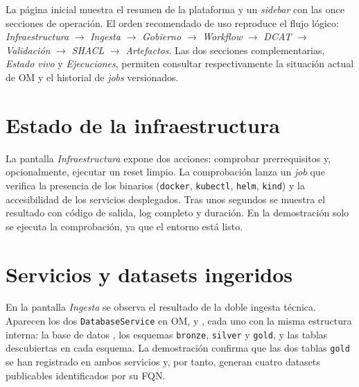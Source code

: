 La página inicial muestra el resumen de la plataforma y un \emph{sidebar} con las once secciones de operación. El orden recomendado de uso reproduce el flujo lógico: \emph{Infraestructura} $\to$ \emph{Ingesta} $\to$ \emph{Gobierno} $\to$ \emph{Workflow} $\to$ \emph{DCAT} $\to$ \emph{Validación} $\to$ \emph{SHACL} $\to$ \emph{Artefactos}. Las dos secciones complementarias, \emph{Estado vivo} y \emph{Ejecuciones}, permiten consultar respectivamente la situación actual de \ac{OM} y el historial de \emph{jobs} versionados.


\section{Estado de la infraestructura}\label{sec:demo-infra}

La pantalla \emph{Infraestructura} expone dos acciones: comprobar prerrequisitos y, opcionalmente, ejecutar un reset limpio. La comprobación lanza un \emph{job} que verifica la presencia de los binarios (\texttt{docker}, \texttt{kubectl}, \texttt{helm}, \texttt{kind}) y la accesibilidad de los servicios desplegados. Tras unos segundos se muestra el resultado con código de salida, log completo y duración. En la demostración solo se ejecuta la comprobación, ya que el entorno está listo.


\section{Servicios y datasets ingeridos}\label{sec:demo-ingesta}

En la pantalla \emph{Ingesta} se observa el resultado de la doble ingesta técnica. Aparecen los dos \texttt{DatabaseService} en \ac{OM},  y , cada uno con la misma estructura interna: la base de datos , los esquemas \texttt{bronze}, \texttt{silver} y \texttt{gold}, y las tablas descubiertas en cada esquema. La demostración confirma que las dos tablas \texttt{gold} se han registrado en ambos servicios y, por tanto, generan cuatro datasets publicables identificados por su \ac{FQN}.

